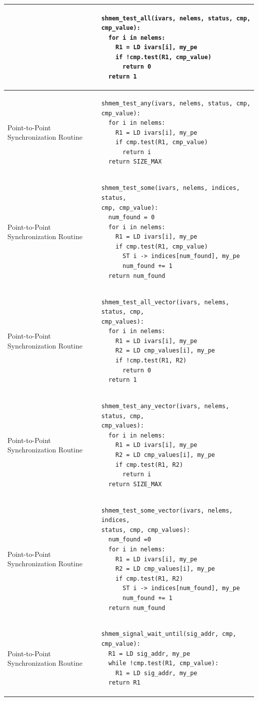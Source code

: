 \begin{longtable}{|m{}|m{}|}
    & \begin{BVerbatim}
shmem_test_all(ivars, nelems, status, cmp,
cmp_value):
  for i in nelems:
    R1 = LD ivars[i], my_pe
    if !cmp.test(R1, cmp_value)
      return 0
  return 1
    \end{BVerbatim}
    \tabularnewline\hline
Point-to-Point Synchronization Routine
    & \begin{BVerbatim}
shmem_test_any(ivars, nelems, status, cmp,
cmp_value):
  for i in nelems:
    R1 = LD ivars[i], my_pe
    if cmp.test(R1, cmp_value)
      return i
  return SIZE_MAX
    \end{BVerbatim}
    \tabularnewline\hline
Point-to-Point Synchronization Routine
    & \begin{BVerbatim}
shmem_test_some(ivars, nelems, indices, status,
cmp, cmp_value):
  num_found = 0
  for i in nelems:
    R1 = LD ivars[i], my_pe
    if cmp.test(R1, cmp_value)
      ST i -> indices[num_found], my_pe
      num_found += 1
  return num_found
    \end{BVerbatim}
    \tabularnewline\hline
Point-to-Point Synchronization Routine
    & \begin{BVerbatim}
shmem_test_all_vector(ivars, nelems, status, cmp,
cmp_values):
  for i in nelems:
    R1 = LD ivars[i], my_pe
    R2 = LD cmp_values[i], my_pe
    if !cmp.test(R1, R2)
      return 0
  return 1
    \end{BVerbatim}
    \tabularnewline\hline
Point-to-Point Synchronization Routine
    & \begin{BVerbatim}
shmem_test_any_vector(ivars, nelems, status, cmp,
cmp_values):
  for i in nelems:
    R1 = LD ivars[i], my_pe
    R2 = LD cmp_values[i], my_pe
    if cmp.test(R1, R2)
      return i
  return SIZE_MAX
    \end{BVerbatim}
    \tabularnewline\hline
Point-to-Point Synchronization Routine
    & \begin{BVerbatim}
shmem_test_some_vector(ivars, nelems, indices,
status, cmp, cmp_values):
  num_found =0
  for i in nelems:
    R1 = LD ivars[i], my_pe
    R2 = LD cmp_values[i], my_pe
    if cmp.test(R1, R2)
      ST i -> indices[num_found], my_pe
      num_found += 1
  return num_found
    \end{BVerbatim}
    \tabularnewline\hline
Point-to-Point Synchronization Routine
    & \begin{BVerbatim}
shmem_signal_wait_until(sig_addr, cmp, cmp_value):
  R1 = LD sig_addr, my_pe
  while !cmp.test(R1, cmp_value):
    R1 = LD sig_addr, my_pe
  return R1
    \end{BVerbatim}

\end{longtable}

